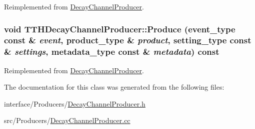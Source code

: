 Reimplemented from \hyperlink{classDecayChannelProducer_a151b0b47507bc8e521fe9acab96d38bc}{DecayChannelProducer}.\hypertarget{classTTHDecayChannelProducer_a156d33176c768ffd652292bf365f73a0}{
\subsubsection[{Produce}]{\setlength{\rightskip}{0pt plus 5cm}void TTHDecayChannelProducer::Produce (event\_\-type const \& {\em event}, \/  product\_\-type \& {\em product}, \/  setting\_\-type const \& {\em settings}, \/  metadata\_\-type const \& {\em metadata}) const}}
\label{classTTHDecayChannelProducer_a156d33176c768ffd652292bf365f73a0}


Reimplemented from \hyperlink{classDecayChannelProducer_a0e10edeaa5e3ae64023b521237f50003}{DecayChannelProducer}.

The documentation for this class was generated from the following files:\begin{DoxyCompactItemize}
\item 
interface/Producers/\hyperlink{DecayChannelProducer_8h}{DecayChannelProducer.h}\item 
src/Producers/\hyperlink{DecayChannelProducer_8cc}{DecayChannelProducer.cc}\end{DoxyCompactItemize}
